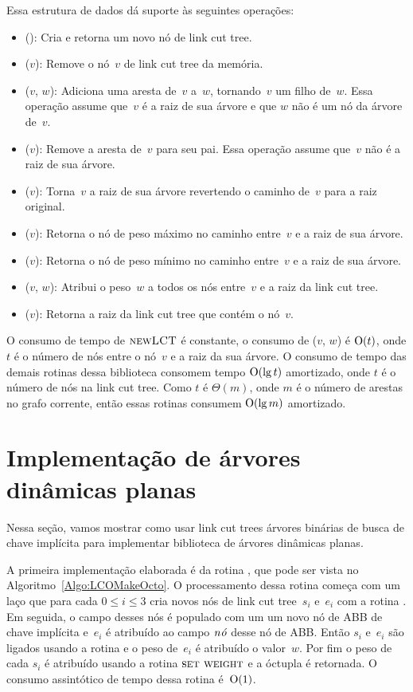 Essa estrutura de dados dá suporte às seguintes operações:
\begin{itemize}
\item \linkcutCreate(): Cria e retorna um novo nó de link cut tree.
\item \linkcutDestroy($v$): Remove o nó~$v$ de link cut tree da memória.
\item \linkcutAddEdge($v$, $w$): Adiciona uma aresta de~$v$ a~$w$, tornando~$v$ um filho de~$w$. Essa operação assume que~$v$ é a raiz de sua árvore e que $w$ não é um nó da árvore de~$v$.
\item \linkcutDelEdge($v$): Remove a aresta de~$v$ para seu pai.
	Essa operação assume que~$v$ não é a raiz de sua árvore.
\item \linkcutEvert($v$): Torna~$v$ a raiz de sua árvore revertendo o caminho de~$v$ para a raiz original.
\item \linkcutMax($v$): Retorna o nó de peso máximo no caminho entre~$v$ e a raiz de sua árvore.
\item \linkcutMin($v$): Retorna o nó de peso mínimo no caminho entre~$v$ e a raiz de sua árvore.
\item \linkcutWeight($v$, $w$): Atribui o peso~$w$ a todos os nós entre~$v$ e a raiz da link cut tree.
\item \linkcutRoot($v$): Retorna a raiz da link cut tree que contém o nó~$v$.
\end{itemize}

O consumo de tempo de $\text{\scshape newLCT}$ é constante, o consumo de \linkcutWeight($v$, $w$) é $\mathrm{O}(t)$, onde $t$ é o número de nós entre o nó~$v$ e a raiz da sua árvore. O consumo de tempo das demais rotinas dessa biblioteca consomem tempo $\mathrm{O}(\lg t)$ amortizado, onde $t$ é o número de nós na link cut tree. Como $t$ é $\Theta(m)$, onde $m$ é o número de arestas no grafo corrente, então essas rotinas consumem $\mathrm{O}(\lg m)$ amortizado.


\section{Implementação de árvores dinâmicas planas}
\label{sec:implementacao-ADP}

Nessa seção, vamos mostrar como usar link cut trees árvores binárias de busca de chave implícita para implementar biblioteca de árvores dinâmicas planas.

A primeira implementação elaborada é da rotina \LCOMakeOcto{}, que pode ser vista no Algoritmo~\ref{Algo:LCOMakeOcto}.
O processamento dessa rotina começa com um laço que para cada $0\leq i\leq 3$ cria novos nós de link cut tree~$s_i$ e~$e_i$ com a rotina \linkcutCreate{}.
Em seguida, o campo  desses nós é populado com um um novo nó de ABB de chave implícita e~$e_i$ é atribuído ao campo $\mathit{n\acute{o}}$ desse nó de ABB.
Então $s_i$ e~$e_i$ são ligados usando a rotina \linkcutAddEdge{} e o peso de~$e_i$ é atribuído o valor~$w$.
Por fim o peso de cada $s_i$ é atribuído usando a rotina $\text{\scshape \text{\scshape set weight}}$ e a óctupla é retornada.
O consumo assintótico de tempo dessa rotina é~$\mathrm{O}(1)$.

